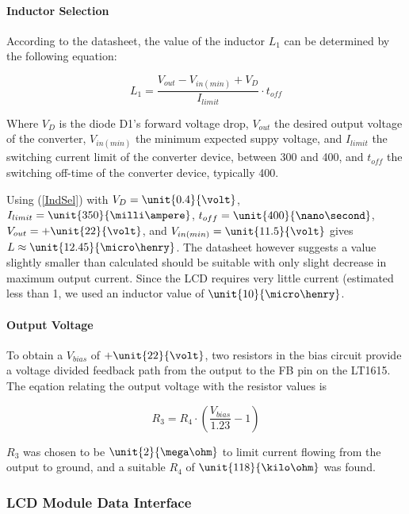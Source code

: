 \paragraph{Inductor Selection}

According to the datasheet, the value of the inductor $L_1$ can be determined by the following equation:

\begin{equation}
L_1=\frac{V_{out}-V_{in(min)}+V_{D}}{I_{limit}}\cdot t_{off}\label{IndSel}
\end{equation}

Where $V_D$ is the diode D1's forward voltage drop, $V_{out}$ the desired output voltage of the converter, $V_{in(min)}$ the minimum expected suppy voltage, and $I_{limit}$ the switching current limit of the converter device, between \unit{300}{\milli\ampere} and \unit{400}{\milli\ampere}, and $t_{off}$ the switching off-time of the converter device, typically \unit{400}{\nano\second}.

Using (\ref{IndSel}) with $V_{D}=\unit{0.4}{\volt}$, $I_{limit}=\unit{350}{\milli\ampere}$, $t_{off}=\unit{400}{\nano\second}$, $V_{out}=+\unit{22}{\volt}$, and $V_{in(min)}=\unit{11.5}{\volt}$ gives $L\approx\unit{12.45}{\micro\henry}$. The datasheet however suggests a value slightly smaller than calculated should be suitable with only slight decrease in maximum output current. Since the LCD requires very little current (estimated less than \unit{1}{\milli\ampere}, we used an inductor value of $\unit{10}{\micro\henry}$.


\paragraph{Output Voltage}

To obtain a $V_{bias}$ of $+\unit{22}{\volt}$, two resistors in the bias circuit provide a voltage divided feedback path from the output to the FB pin on the LT1615. The eqation relating the output voltage with the resistor values is

\begin{equation}
R_{3}=R_{4}\cdot\left(\frac{V_{bias}}{1.23}-1\right)
\end{equation}

 $R_{3}$ was chosen to be $\unit{2}{\mega\ohm}$ to limit current flowing from the output to ground, and a suitable $R_{4}$ of $\unit{118}{\kilo\ohm}$ was found.


\subsubsection{LCD Module Data Interface\label{sec:lcd_module_data_interface}}

